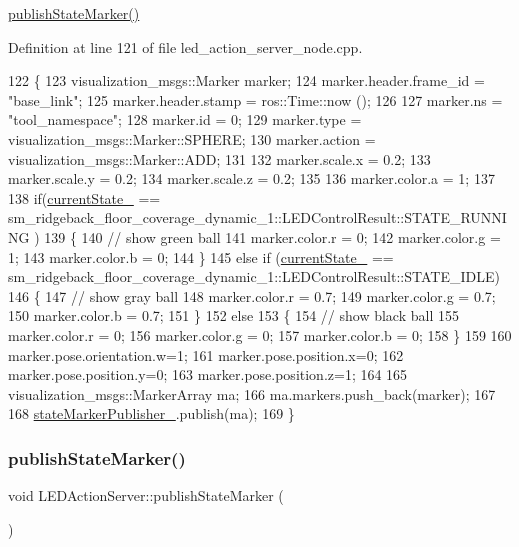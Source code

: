 \hyperlink{classLEDActionServer_a73bb754ac2347c50660624ad92315895}{publish\+State\+Marker()} 

Definition at line 121 of file led\+\_\+action\+\_\+server\+\_\+node.\+cpp.


\begin{DoxyCode}
122 \{
123     visualization\_msgs::Marker marker;
124     marker.header.frame\_id = \textcolor{stringliteral}{"base\_link"};
125     marker.header.stamp = ros::Time::now ();
126 
127     marker.ns = \textcolor{stringliteral}{"tool\_namespace"};
128     marker.id = 0;
129     marker.type = visualization\_msgs::Marker::SPHERE;
130     marker.action = visualization\_msgs::Marker::ADD;
131     
132     marker.scale.x = 0.2;
133     marker.scale.y = 0.2;
134     marker.scale.z = 0.2;
135 
136     marker.color.a = 1;
137 
138     \textcolor{keywordflow}{if}(\hyperlink{classLEDActionServer_a1dc456e987dc331501ad6ff2215661ff}{currentState\_} == sm\_ridgeback\_floor\_coverage\_dynamic\_1::LEDControlResult::STATE\_RUNNING
      )
139     \{
140       \textcolor{comment}{// show green ball}
141       marker.color.r = 0;
142       marker.color.g = 1;
143       marker.color.b = 0;
144     \}
145     \textcolor{keywordflow}{else} \textcolor{keywordflow}{if} (\hyperlink{classLEDActionServer_a1dc456e987dc331501ad6ff2215661ff}{currentState\_} == 
      sm\_ridgeback\_floor\_coverage\_dynamic\_1::LEDControlResult::STATE\_IDLE)
146     \{
147       \textcolor{comment}{// show gray ball}
148       marker.color.r = 0.7;
149       marker.color.g = 0.7;
150       marker.color.b = 0.7;
151     \}
152     \textcolor{keywordflow}{else}
153     \{
154       \textcolor{comment}{// show black ball}
155       marker.color.r = 0;
156       marker.color.g = 0;
157       marker.color.b = 0;
158     \}
159 
160     marker.pose.orientation.w=1;
161     marker.pose.position.x=0;
162     marker.pose.position.y=0;
163     marker.pose.position.z=1;
164 
165     visualization\_msgs::MarkerArray ma;
166     ma.markers.push\_back(marker);
167 
168     \hyperlink{classLEDActionServer_a4168a1e4a17eb1d65aaa059ce0c52086}{stateMarkerPublisher\_}.publish(ma);
169 \}
\end{DoxyCode}
\mbox{\label{classLEDActionServer_a73bb754ac2347c50660624ad92315895}} 
\subsubsection{\texorpdfstring{publish\+State\+Marker()}{publishStateMarker()}\hspace{0.1cm}{\footnotesize\ttfamily [3/5]}}
{\footnotesize\ttfamily void L\+E\+D\+Action\+Server\+::publish\+State\+Marker (\begin{DoxyParamCaption}{ }\end{DoxyParamCaption})\hspace{0.3cm}{\ttfamily [inline]}}

